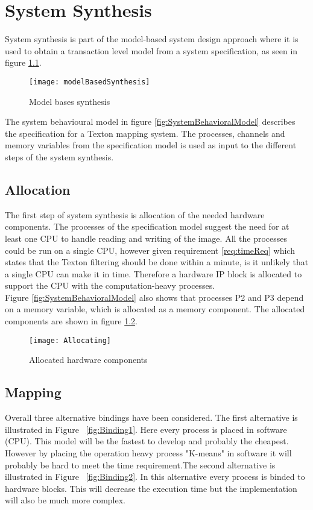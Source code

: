 \chapter{System Synthesis}
System synthesis is part of the model-based system design approach where it is used to obtain a transaction level model from a system specification, as seen in figure \ref{fig:modelBasedSyn}. 

\begin{figure}[H]
\centering
\texttt{[image: modelBasedSynthesis]}
\caption{Model bases synthesis}
\label{fig:modelBasedSyn}
\end{figure}

The system behavioural model in figure \ref{fig:SystemBehavioralModel} describes the specification for a Texton mapping system. 
The processes, channels and memory variables from the specification model is used as input to the different steps of the system synthesis.  

\section{Allocation}
The first step of system synthesis is allocation of the needed hardware components. 
The processes of the specification model suggest the need for at least one CPU to handle reading and writing of the image. 
All the processes could be run on a single CPU, however given requirement \ref{req:timeReq} which states that the Texton filtering should be done within a minute, is it unlikely that a single CPU can make it in time. 
Therefore a hardware IP block is allocated to support the CPU with the computation-heavy processes.
\\Figure \ref{fig:SystemBehavioralModel} also shows that processes P2 and P3 depend on a memory variable, which is allocated as a memory component. The allocated components are shown in figure \ref{fig:allocHardComps}.

\begin{figure}[H]
\centering
\texttt{[image: Allocating]}
\caption{Allocated hardware components}
\label{fig:allocHardComps}
\end{figure}


\section{Mapping}

Overall three alternative bindings have been considered. The first alternative is illustrated in Figure ~\ref{fig:Binding1}. Here every process is placed in software (CPU). This model will be the fastest to develop and probably the cheapest. However by placing the operation heavy process "K-means" in software it will probably be hard to meet the time requirement.The second alternative is illustrated in Figure ~\ref{fig:Binding2}. In this alternative every process is binded to hardware blocks. This will decrease the execution time but the implementation will also be much more complex.

